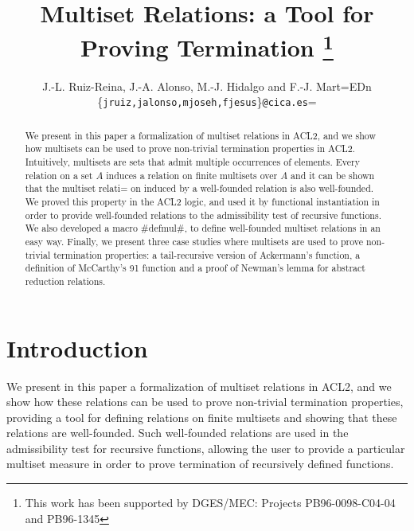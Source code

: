 \documentclass[11pt]{llncs}
\begin{document}
\title{Multiset Relations: a Tool for Proving Termination
\thanks{This work has been supported by  DGES/MEC: Projects
PB96-0098-C04-04 and PB96-1345}}

\author{J.-L. Ruiz-Reina, J.-A. Alonso, M.-J. Hidalgo
and F.-J. Mart=EDn \\ \{{\tt jruiz,jalonso,mjoseh,fjesus}\}{\tt @cica.es}=
}


\maketitle
\vspace{-0.7cm}
\begin{abstract}

We present in this paper a formalization of multiset relations in ACL2,
and we show how multisets can be used to prove non-trivial termination
properties in ACL2. Intuitively, multisets are sets that admit multiple
occurrences of elements. Every relation on a set $A$ induces a relation
on finite multisets over $A$ and it can be shown that the multiset relati=
on
induced by a well-founded relation is also well-founded. We proved this
property in the ACL2 logic, and used it by functional
instantiation in order to provide well-founded relations to the
admissibility test of recursive functions. We also developed a macro
#defmul#, to define well-founded multiset relations in an easy
way. Finally, we present three case studies where multisets are
used to prove non-trivial termination properties: a tail-recursive
version of Ackermann's function, a definition of McCarthy's 91 function
and a proof of Newman's lemma for abstract reduction relations.

\end{abstract}

\pagestyle{empty}

%
\section*{Introduction}

We present in this paper a formalization of multiset relations in ACL2,
and we show how these relations can be used to prove non-trivial
termination properties, providing a tool for defining relations on
finite multisets and showing that these relations are well-founded. Such
well-founded relations are used in the admissibility test for recursive
functions, allowing the user to provide a particular multiset measure in
order to prove termination of recursively defined functions.
\end{document}
